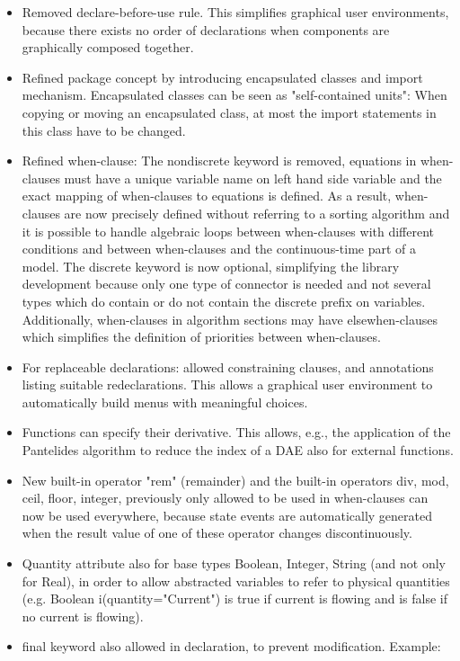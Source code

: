\documentclass[10pt,a4paper]{report}
\begin{document}
\begin{itemize}
\item
  Removed declare-before-use rule. This simplifies graphical user
  environments, because there exists no order of declarations when
  components are graphically composed together.
\item
  Refined package concept by introducing encapsulated classes and import
  mechanism. Encapsulated classes can be seen as "self-contained units":
  When copying or moving an encapsulated class, at most the import
  statements in this class have to be changed.
\item
  Refined when-clause: The nondiscrete keyword is removed, equations in
  when-clauses must have a unique variable name on left hand side
  variable and the exact mapping of when-clauses to equations is
  defined. As a result, when-clauses are now precisely defined without
  referring to a sorting algorithm and it is possible to handle
  algebraic loops between when-clauses with different conditions and
  between when-clauses and the continuous-time part of a model. The
  discrete keyword is now optional, simplifying the library development
  because only one type of connector is needed and not several types
  which do contain or do not contain the discrete prefix on variables.
  Additionally, when-clauses in algorithm sections may have
  elsewhen-clauses which simplifies the definition of priorities between
  when-clauses.
\item
  For replaceable declarations: allowed constraining clauses, and
  annotations listing suitable redeclarations. This allows a graphical
  user environment to automatically build menus with meaningful choices.
\item
  Functions can specify their derivative. This allows, e.g., the
  application of the Pantelides algorithm to reduce the index of a DAE
  also for external functions.
\item
  New built-in operator "rem" (remainder) and the built-in operators
  div, mod, ceil, floor, integer, previously only allowed to be used in
  when-clauses can now be used everywhere, because state events are
  automatically generated when the result value of one of these operator
  changes discontinuously.
\item
  Quantity attribute also for base types Boolean, Integer, String (and
  not only for Real), in order to allow abstracted variables to refer to
  physical quantities (e.g. Boolean i(quantity="Current") is true if
  current is flowing and is false if no current is flowing).
\item
  final keyword also allowed in declaration, to prevent modification.
  Example:
\end{itemize}
\end{document}
